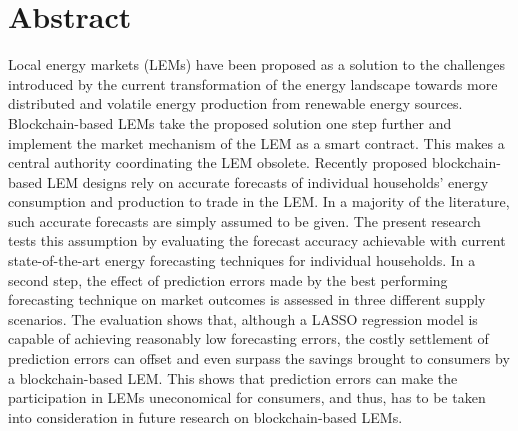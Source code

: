 \section*{Abstract}

Local energy markets (LEMs) have been proposed as a solution to the challenges introduced by the current transformation of the energy landscape towards more distributed and volatile energy production from renewable energy sources. Blockchain-based LEMs take the proposed solution one step further and implement the market mechanism of the LEM as a smart contract. This makes a central authority coordinating the LEM obsolete. Recently proposed blockchain-based LEM designs rely on accurate forecasts of individual households' energy consumption and production to trade in the LEM. In a majority of the literature, such accurate forecasts are simply assumed to be given. The present research tests this assumption by evaluating the forecast accuracy achievable with current state-of-the-art energy forecasting techniques for individual households. In a second step, the effect of prediction errors made by the best performing forecasting technique on market outcomes is assessed in three different supply scenarios. The evaluation shows that, although a LASSO regression model is capable of achieving reasonably low forecasting errors, the costly settlement of prediction errors can offset and even surpass the savings brought to consumers by a blockchain-based LEM. This shows that prediction errors can make the participation in LEMs uneconomical for consumers, and thus, has to be taken into consideration in future research on blockchain-based LEMs.

